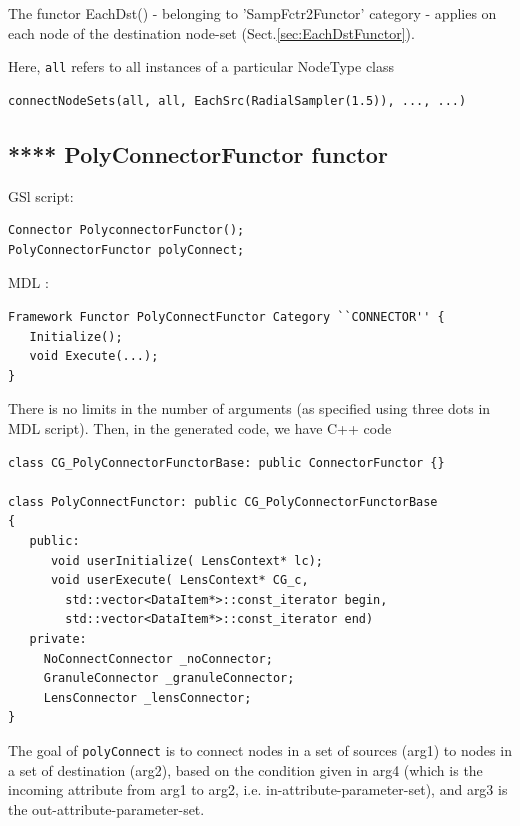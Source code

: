 The functor EachDst() - belonging to 'SampFctr2Functor' category - applies on
each node of the destination node-set (Sect.\ref{sec:EachDstFunctor}).

Here, \verb!all! refers to all instances of a particular NodeType class
\begin{verbatim}
connectNodeSets(all, all, EachSrc(RadialSampler(1.5)), ..., ...)
\end{verbatim}



\subsection{**** PolyConnectorFunctor functor}
\label{sec:polyConnect-functor}

GSl script:
\begin{verbatim}
Connector PolyconnectorFunctor();
PolyConnectorFunctor polyConnect;
\end{verbatim}
MDL :
\begin{verbatim}
Framework Functor PolyConnectFunctor Category ``CONNECTOR'' {
   Initialize();
   void Execute(...);
}
\end{verbatim}
There is no limits in the number of arguments (as specified using three dots in
MDL script). Then, in the generated code, we have C++ code

\begin{lstlisting}
class CG_PolyConnectorFunctorBase: public ConnectorFunctor {}

class PolyConnectFunctor: public CG_PolyConnectorFunctorBase
{
   public:
      void userInitialize( LensContext* lc);
      void userExecute( LensContext* CG_c,
        std::vector<DataItem*>::const_iterator begin,
        std::vector<DataItem*>::const_iterator end)
   private:
     NoConnectConnector _noConnector;
     GranuleConnector _granuleConnector;
     LensConnector _lensConnector;   
}
\end{lstlisting}


The goal of \verb!polyConnect! is to connect nodes in a set of sources (arg1) to 
nodes in a set of destination (arg2), based on the condition given in arg4
(which is the incoming attribute from arg1 to arg2,
i.e. in-attribute-parameter-set), and arg3 is the out-attribute-parameter-set.

